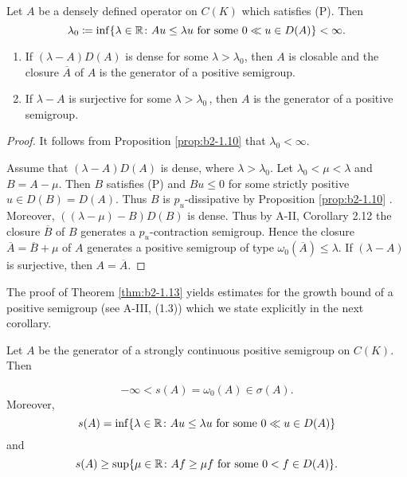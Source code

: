 \begin{theorem}\label{thm:b2-1.13}
%
Let $A$ be a densely defined operator on $C(K)$ which satisfies (P).
Then
\[
    \lambda_{0} \coloneqq \inf\{\lambda \in \mathbb{R} \colon Au \leq \lambda u \text{ for some } 0 \ll u \in D(A)\} < \infty.
\]
\begin{enumerate}[\upshape (i)]
\item \label{thm:b2-1.13-1}
If $(\lambda - A)D(A)$ is dense for some $\lambda > \lambda_{0}$, then $A$ is closable and the closure $\overline{A}$ of $A$ is the generator of a positive semigroup.

\item \label{thm:b2-1.13-2}
If $\lambda - A$ is surjective for some $\lambda > \lambda_{0}$\,, then $A$ is the generator of a positive semigroup.
\end{enumerate}
\end{theorem}

\begin{proof}
It follows from Proposition \ref{prop:b2-1.10} that $\lambda_{0} < \infty$.

Assume that $(\lambda - A)D(A)$ is dense, where $\lambda > \lambda_{0}$.
Let $\lambda_{0} < \mu < \lambda$ and $B = A - \mu$.
Then $B$ satisfies (P) and $Bu \leq 0$ for some strictly positive $u \in D(B) = D(A)$.
Thus $B$ is $p_{u}$-dissipative by Proposition \ref{prop:b2-1.10} .
Moreover, $((\lambda-\mu) - B)D(B)$ is dense.
Thus by A-II, Corollary 2.12 
the closure $\overline{B}$ of $B$ generates a $p_{u}$-contraction semigroup.
Hence the
closure $\overline{A} = \overline{B} + \mu$ of $A$ generates a positive semigroup of type $\omega_{0}(\overline{A}) \leq \lambda$.
If $(\lambda - A)$ is surjective, then $A = \overline{A}$.
\end{proof}

The proof of Theorem \ref{thm:b2-1.13} yields estimates for the growth bound of a positive semigroup (see A-III, (1.3)) which we state explicitly in the next corollary.

\begin{corollary}\label{cor:b2-1.14}
Let $A$ be the generator of a strongly continuous positive semigroup on $C(K)$.
Then

\begin{equation}\label{eq:b2-1.7}
-\infty < s(A) = \omega_{0}(A) \in \sigma(A).
\end{equation}
Moreover,
\begin{equation}\label{eq:b2-1.8}
s(A) = \inf\{\lambda \in \mathbb{R} \colon Au \leq \lambda u \text{ for some } 0 \ll u \in D(A)\}
\end{equation}
and
\begin{equation}\label{eq:b2-1.9}
s(A) \geq \sup\{\mu \in \mathbb{R} \colon Af \geq \mu f \text{ for some } 0 < f \in D(A)\}.
\end{equation}
\end{corollary}

